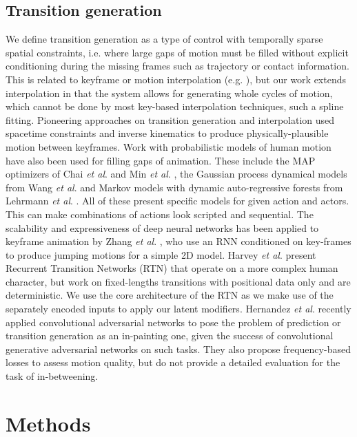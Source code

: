\documentclass[acmtog]{acmart}
\newcommand{\etal}{\textit{et al}. }
\begin{document}
\subsection{Transition generation}
We define transition generation as a type of control with temporally sparse spatial constraints, i.e. where large gaps of motion must be filled without explicit conditioning during the missing frames such as trajectory or contact information. This is related to keyframe or motion interpolation (e.g. \cite{Ciccone:2019:TOI:3306346.3322938}), but our work extends interpolation in that the system allows for generating whole cycles of motion, which cannot be done by most key-based interpolation techniques, such a spline fitting. Pioneering approaches \cite{Witkin:1988:SC:54852.378507, cohen1996efficient} on transition generation and interpolation used spacetime constraints and inverse kinematics to produce physically-plausible motion between keyframes. Work with probabilistic models of human motion have also been used for filling gaps of animation. These include the MAP optimizers of Chai \etal {} and Min \etal {}, the Gaussian process dynamical models from Wang \etal {} and Markov models with dynamic auto-regressive forests from Lehrmann \etal {}. All of these present specific models for given action and actors. This can make combinations of actions look scripted and sequential. The scalability and expressiveness of deep neural networks has been applied to keyframe animation by Zhang \etal {}, who use an RNN conditioned on key-frames to produce jumping motions for a simple 2D model. Harvey \etal {} present Recurrent Transition Networks (RTN) that operate on a more complex human character, but work on fixed-lengths transitions with positional data only and are deterministic. We use the core architecture of the RTN as we make use of the separately encoded inputs to apply our latent modifiers.
Hernandez \etal {} recently applied convolutional adversarial networks to pose the problem of prediction or transition generation as an in-painting one, given the success of convolutional generative adversarial networks on such tasks. They also propose frequency-based losses to assess motion quality, but do not provide a detailed evaluation for the task of in-betweening.
\section{Methods}\label{section:model}
\end{document}
